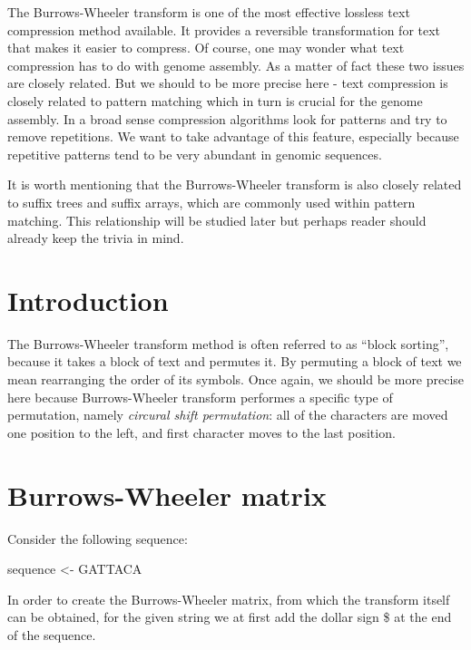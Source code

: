 \documentclass[
]{book}
\newenvironment{Shaded}{\begin{snugshade}}{\end{snugshade}}
\newcommand{\NormalTok}[1]{#1}
\newcommand{\OtherTok}[1]{\textcolor[rgb]{0.56,0.35,0.01}{#1}}
\newcommand{\StringTok}[1]{\textcolor[rgb]{0.31,0.60,0.02}{#1}}
\begin{document}
The Burrows-Wheeler transform is one of the most effective lossless text compression method available. It provides a reversible transformation for text that makes it easier to compress. Of course, one may wonder what text compression has to do with genome assembly. As a matter of fact these two issues are closely related. But we should to be more precise here - text compression is closely related to pattern matching which in turn is crucial for the genome assembly. In a broad sense compression algorithms look for patterns and try to remove repetitions. We want to take advantage of this feature, especially because repetitive patterns tend to be very abundant in genomic sequences.

It is worth mentioning that the Burrows-Wheeler transform is also closely related to suffix trees and suffix arrays, which are commonly used within pattern matching. This relationship will be studied later but perhaps reader should already keep the trivia in mind. \citep{bw1}

\hypertarget{introduction-1}{%
\section{Introduction}\label{introduction-1}}

The Burrows-Wheeler transform method is often referred to as ``block sorting'', because it takes a block of text and permutes it. By permuting a block of text we mean rearranging the order of its symbols. Once again, we should be more precise here because Burrows-Wheeler transform performes a specific type of permutation, namely \emph{circural shift permutation}: all of the characters are moved one position to the left, and first character moves to the last position.

\hypertarget{burrows-wheeler-matrix}{%
\section{Burrows-Wheeler matrix}\label{burrows-wheeler-matrix}}

Consider the following sequence:

\begin{Shaded}
\begin{Highlighting}[]
\NormalTok{sequence }\OtherTok{\textless{}{-}} \StringTok{\textquotesingle{}GATTACA\textquotesingle{}}
\end{Highlighting}
\end{Shaded}

In order to create the Burrows-Wheeler matrix, from which the transform itself can be obtained, for the given string we at first add the dollar sign \$ at the end of the sequence.
\end{document}
